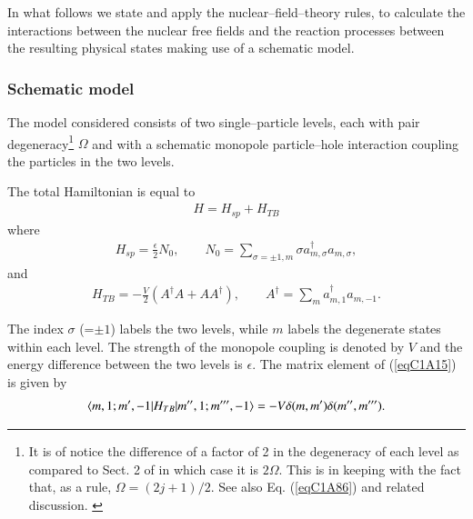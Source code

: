 In what follows we state and apply the nuclear--field--theory rules, to calculate the interactions between the nuclear free fields and the reaction processes
between the resulting physical states making use of a schematic model. \subsubsection{Schematic model}
The model considered consists of two single--particle levels, each with pair degeneracy\footnote{It is of notice the difference of a factor of 2 in the degeneracy of each level as compared to Sect. 2 of \cite{Bortignon:77} in which case it is $2\Omega$. This is in keeping with the fact that, as a rule, $\Omega=(2j+1)/2$. See also Eq. (\ref{eqC1A86}) and related discussion. \label{fnlabel}} $\Omega$ and with a schematic monopole particle--hole interaction coupling the particles in the two levels.

The total Hamiltonian is equal to
\begin{align}\label{eqC1A13} 
H=H_{sp}+H_{TB}
\end{align}
where
\begin{align}\label{eqC1A14} 
H_{sp}=\frac{\epsilon}{2}N_0,\quad\quad N_0=\sum_{\sigma=\pm 1,m}\sigma a^{\dagger}_{m,\sigma}a_{m,\sigma},
\end{align}
and
\begin{align}\label{eqC1A15} 
H_{TB}=-\frac{V}{2}\left(A^\dagger A+AA^\dagger\right),\quad\quad A^\dagger=\sum_m a^\dagger_{m,1}a_{m,-1}.
\end{align}


The index $\sigma$ (=$\pm1$) labels the two levels, while $m$ labels the degenerate states within
each level. The strength of the monopole coupling is denoted by $V$ and the
energy difference between the two levels is $\epsilon$. 
The matrix element of (\ref{eqC1A15}) is given by
\begin{align}\label{eqC1A16} 
\langle {m,1;m',-1|H_{TB}|m'',1;m''',-1} \rangle=-V\delta(m,m')\delta(m'',m''').
\end{align}
